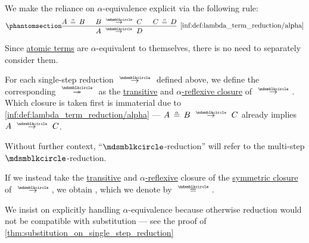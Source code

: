 \begin{definition}
\begin{thmenum}
    We make the reliance on \( \alpha \)-equivalence explicit via the following rule:
    \begin{equation*}\taglabel[\ensuremath{ \logic{Alpha}_{\Anon} }]{inf:def:lambda_term_reduction/alpha}
      \begin{prooftree}
        \hypo{ A \aequiv B }
        \hypo{ B \pred C }
        \hypo{ C \aequiv D }
        \infer3[\ref{inf:def:lambda_term_reduction/alpha}]{ A \pred D }.
      \end{prooftree}
    \end{equation*}

    Since \hyperref[def:lambda_term/atom]{atomic terms} are \( \alpha \)-equivalent to themselves, there is no need to separately consider them.

     For each single-step reduction \( {\pred} \) defined above, we define the corresponding  \( {\pred*} \) as the \hyperref[def:relation_closures/transitive]{transitive} and \hyperref[def:alpha_reflexive]{\( \alpha \)-reflexive closure} of \( {\pred} \). Which closure is taken first is immaterial due to \ref{inf:def:lambda_term_reduction/alpha} --- \( A \aequiv B \pred C \) already implies \( A \pred C \).

    Without further context, \enquote{\( {\Anon} \)-reduction} will refer to the multi-step \( {\Anon} \)-reduction.

     If we instead take the
    \hyperref[def:relation_closures/transitive]{transitive} and \hyperref[def:alpha_reflexive]{\( \alpha \)-reflexive} closure of the \hyperref[def:relation_closures/symmetric]{symmetric closure} of \( \pred \), we obtain , which we denote by \( {\equivrel{\Anon}} \).
  \end{thmenum}
\end{definition}
\begin{comments}
  \item We insist on explicitly handling \( \alpha \)-equivalence because otherwise reduction would not be compatible with substitution --- see the proof of \cref{thm:substitution_on_single_step_reduction}
\end{comments}

